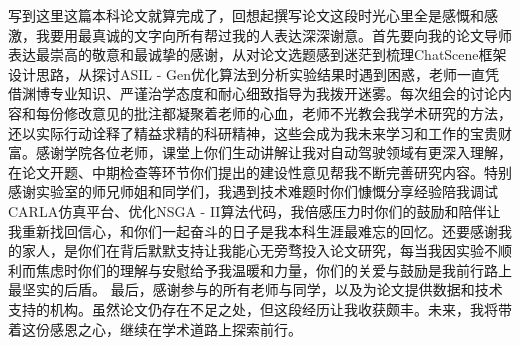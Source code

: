 \begin{acknowledgements} 

写到这里这篇本科论文就算完成了，回想起撰写论文这段时光心里全是感慨和感激，我要用最真诚的文字向所有帮过我的人表达深深谢意。首先要向我的论文导师表达最崇高的敬意和最诚挚的感谢，从对论文选题感到迷茫到梳理ChatScene框架设计思路，从探讨ASIL - Gen优化算法到分析实验结果时遇到困惑，老师一直凭借渊博专业知识、严谨治学态度和耐心细致指导为我拨开迷雾。每次组会的讨论内容和每份修改意见的批注都凝聚着老师的心血，老师不光教会我学术研究的方法，还以实际行动诠释了精益求精的科研精神，这些会成为我未来学习和工作的宝贵财富。感谢学院各位老师，课堂上你们生动讲解让我对自动驾驶领域有更深入理解，在论文开题、中期检查等环节你们提出的建设性意见帮我不断完善研究内容。特别感谢实验室的师兄师姐和同学们，我遇到技术难题时你们慷慨分享经验陪我调试CARLA仿真平台、优化NSGA - II算法代码，我倍感压力时你们的鼓励和陪伴让我重新找回信心，和你们一起奋斗的日子是我本科生涯最难忘的回忆。还要感谢我的家人，是你们在背后默默支持让我能心无旁骛投入论文研究，每当我因实验不顺利而焦虑时你们的理解与安慰给予我温暖和力量，你们的关爱与鼓励是我前行路上最坚实的后盾。
最后，感谢参与的所有老师与同学，以及为论文提供数据和技术支持的机构。虽然论文仍存在不足之处，但这段经历让我收获颇丰。未来，我将带着这份感恩之心，继续在学术道路上探索前行。

\end{acknowledgements}
